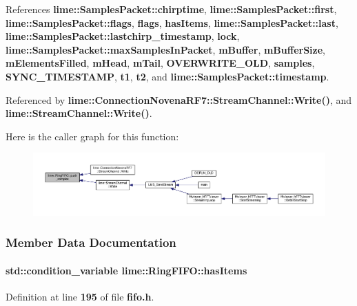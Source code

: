 References {\bf lime\+::\+Samples\+Packet\+::chirptime}, {\bf lime\+::\+Samples\+Packet\+::first}, {\bf lime\+::\+Samples\+Packet\+::flags}, {\bf flags}, {\bf has\+Items}, {\bf lime\+::\+Samples\+Packet\+::last}, {\bf lime\+::\+Samples\+Packet\+::lastchirp\+\_\+timestamp}, {\bf lock}, {\bf lime\+::\+Samples\+Packet\+::max\+Samples\+In\+Packet}, {\bf m\+Buffer}, {\bf m\+Buffer\+Size}, {\bf m\+Elements\+Filled}, {\bf m\+Head}, {\bf m\+Tail}, {\bf O\+V\+E\+R\+W\+R\+I\+T\+E\+\_\+\+O\+LD}, {\bf samples}, {\bf S\+Y\+N\+C\+\_\+\+T\+I\+M\+E\+S\+T\+A\+MP}, {\bf t1}, {\bf t2}, and {\bf lime\+::\+Samples\+Packet\+::timestamp}.



Referenced by {\bf lime\+::\+Connection\+Novena\+R\+F7\+::\+Stream\+Channel\+::\+Write()}, and {\bf lime\+::\+Stream\+Channel\+::\+Write()}.



Here is the caller graph for this function\+:
\nopagebreak
\begin{figure}[H]
\begin{center}
\leavevmode
\includegraphics[width=350pt]{d2/d97/classlime_1_1RingFIFO_a283e956a127a6ad95d2d14f5f506ccdf_icgraph}
\end{center}
\end{figure}




\subsubsection{Member Data Documentation}
\paragraph[{has\+Items}]{\setlength{\rightskip}{0pt plus 5cm}std\+::condition\+\_\+variable lime\+::\+Ring\+F\+I\+F\+O\+::has\+Items\hspace{0.3cm}{\ttfamily [protected]}}\label{classlime_1_1RingFIFO_a5916b95554475303110371a3dc022c24}


Definition at line {\bf 195} of file {\bf fifo.\+h}.



